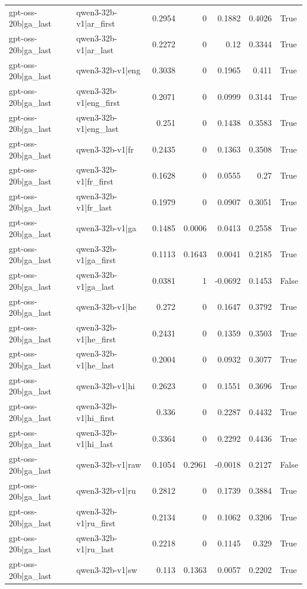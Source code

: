 \begin{table}
\begin{tabular}{l l r r r r l}
gpt-oss-20b|ga_last & qwen3-32b-v1|ar_first & 0.2954 & 0 & 0.1882 & 0.4026 & True \\
gpt-oss-20b|ga_last & qwen3-32b-v1|ar_last & 0.2272 & 0 & 0.12 & 0.3344 & True \\
gpt-oss-20b|ga_last & qwen3-32b-v1|eng & 0.3038 & 0 & 0.1965 & 0.411 & True \\
gpt-oss-20b|ga_last & qwen3-32b-v1|eng_first & 0.2071 & 0 & 0.0999 & 0.3144 & True \\
gpt-oss-20b|ga_last & qwen3-32b-v1|eng_last & 0.251 & 0 & 0.1438 & 0.3583 & True \\
gpt-oss-20b|ga_last & qwen3-32b-v1|fr & 0.2435 & 0 & 0.1363 & 0.3508 & True \\
gpt-oss-20b|ga_last & qwen3-32b-v1|fr_first & 0.1628 & 0 & 0.0555 & 0.27 & True \\
gpt-oss-20b|ga_last & qwen3-32b-v1|fr_last & 0.1979 & 0 & 0.0907 & 0.3051 & True \\
gpt-oss-20b|ga_last & qwen3-32b-v1|ga & 0.1485 & 0.0006 & 0.0413 & 0.2558 & True \\
gpt-oss-20b|ga_last & qwen3-32b-v1|ga_first & 0.1113 & 0.1643 & 0.0041 & 0.2185 & True \\
gpt-oss-20b|ga_last & qwen3-32b-v1|ga_last & 0.0381 & 1 & -0.0692 & 0.1453 & False \\
gpt-oss-20b|ga_last & qwen3-32b-v1|he & 0.272 & 0 & 0.1647 & 0.3792 & True \\
gpt-oss-20b|ga_last & qwen3-32b-v1|he_first & 0.2431 & 0 & 0.1359 & 0.3503 & True \\
gpt-oss-20b|ga_last & qwen3-32b-v1|he_last & 0.2004 & 0 & 0.0932 & 0.3077 & True \\
gpt-oss-20b|ga_last & qwen3-32b-v1|hi & 0.2623 & 0 & 0.1551 & 0.3696 & True \\
gpt-oss-20b|ga_last & qwen3-32b-v1|hi_first & 0.336 & 0 & 0.2287 & 0.4432 & True \\
gpt-oss-20b|ga_last & qwen3-32b-v1|hi_last & 0.3364 & 0 & 0.2292 & 0.4436 & True \\
gpt-oss-20b|ga_last & qwen3-32b-v1|raw & 0.1054 & 0.2961 & -0.0018 & 0.2127 & False \\
gpt-oss-20b|ga_last & qwen3-32b-v1|ru & 0.2812 & 0 & 0.1739 & 0.3884 & True \\
gpt-oss-20b|ga_last & qwen3-32b-v1|ru_first & 0.2134 & 0 & 0.1062 & 0.3206 & True \\
gpt-oss-20b|ga_last & qwen3-32b-v1|ru_last & 0.2218 & 0 & 0.1145 & 0.329 & True \\
gpt-oss-20b|ga_last & qwen3-32b-v1|sw & 0.113 & 0.1363 & 0.0057 & 0.2202 & True \\

\end{tabular}
\end{table}
